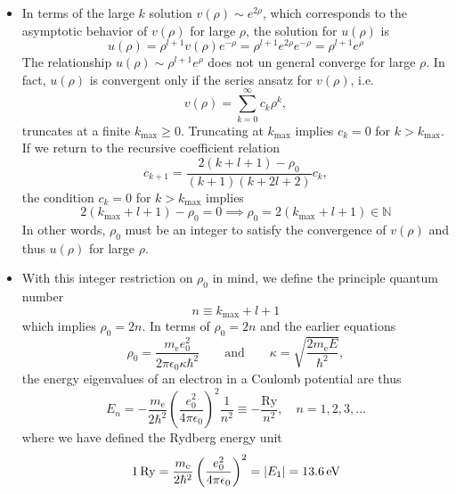 \documentclass[11pt, a4paper]{article}
\newcommand{\eqtext}[1]{\qquad \text{#1} \qquad}
\begin{document}
\begin{itemize}
	\item In terms of the large $ k $ solution $ v(\rho) \sim e^{2\rho} $, which corresponds to the asymptotic behavior of $ v(\rho) $ for large $ \rho $, the solution for $ u(\rho) $ is
	\begin{equation*}
		u(\rho) = \rho^{l+1}v(\rho)e^{-\rho} = \rho^{l+1}e^{2\rho}e^{-\rho} =  \rho^{l+1}e^{\rho}
	\end{equation*}
	The relationship $ u(\rho) \sim \rho^{l+1}e^{\rho} $ does not un general converge for large $ \rho $. In fact, $ u(\rho) $ is convergent only if the series ansatz for $ v(\rho) $, i.e.
	\begin{equation*}
		v(\rho) = \sum_{k = 0}^{\infty}c_{k}\rho^{k},
	\end{equation*}
	truncates at a finite $ k_{\text{max}} \geq 0 $. Truncating at $ k_{\text{max}} $ implies $ c_{k} = 0 $ for $ k > k_{\text{max}} $. If we return to the recursive coefficient relation
	\begin{equation*}
		c_{k+1} = \frac{2(k+l+1)-\rho_{0}}{(k+1)(k+2l + 2)}c_{k},
	\end{equation*}
	the condition $ c_{k} = 0 $ for $ k > k_{\text{max}} $ implies
	\begin{equation*}
		2(k_{\text{max}} + l + 1) - \rho_{0} = 0 \implies \rho_{0} = 2(k_{\text{max}} + l + 1) \in \mathbb{N}
	\end{equation*}
	In other words, $ \rho_{0} $ must be an integer to satisfy the convergence of $ v(\rho) $ and thus $ u(\rho) $ for large $ \rho $. 
	
	\item With this integer restriction on $ \rho_{0} $ in mind, we define the principle quantum number
	\begin{equation*}
		n \equiv k_{\text{max}} + l + 1
	\end{equation*}
	which implies $ \rho_{0} = 2n $. In terms of $ \rho_{0} = 2n $ and the earlier equations
	\begin{equation*}
		\rho_{0} = \frac{m_{\text{e}}e_{0}^{2}}{2\pi \epsilon_{0}\kappa \hbar^{2}} \eqtext{and} \kappa = \sqrt{\frac{2m_{\text{e}}E}{\hbar^{2}}},
	\end{equation*}
	the energy eigenvalues of an electron in a Coulomb potential are thus
	\begin{equation*}
		E_{n} = - \frac{m_{\text{e}}}{2\hbar^{2}}\left(\frac{e_{0}^{2}}{4\pi \epsilon_{0}}\right)^{2}\frac{1}{n^{2}} \equiv - \frac{\text{Ry}}{n^{2}}, \quad n = 1, 2, 3, \ldots
	\end{equation*}
	where we have defined the Rydberg energy unit
	\begin{equation*}
		\SI{1}{Ry} = \frac{m_{\text{e}}}{2\hbar^{2}}\left(\frac{e_{0}^{2}}{4\pi \epsilon_{0}}\right)^{2} = \abs{E_{1}} = \SI{13.6}{\electronvolt}
	\end{equation*}
\end{itemize}
\end{document}
